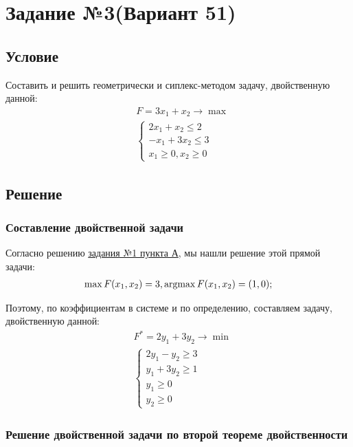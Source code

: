 \section{Задание №3(Вариант 51)}\label{03-lab}
\subsection{Условие}\label{03-lab-condition}

Составить и решить геометрически и сиплекс-методом задачу, двойственную данной:
\begin{align*}
    &F = 3x_1 + x_2 \to \max\\
    &\begin{cases}
        2x_1 + x_2 \leq 2\\
        -x_1 + 3x_2 \leq 3\\
        x_1 \geq 0, x_2 \geq 0
    \end{cases}
\end{align*}

\subsection{Решение}\label{03-lab-solution}

\subsubsection{Составление двойственной задачи}
Согласно решению \hyperref[01-lab-a-answer]{задания №1 пункта А}, мы нашли решение этой прямой задачи:
\begin{align*}
    \max F(x_1, x_2) = 3, \operatorname*{argmax} F(x_1, x_2) = (1, 0);\\
\end{align*} 

Поэтому, по коэффициентам в системе и по определению, составляем задачу, двойственную данной:
\begin{align*}
    &F^{*} = 2y_1 + 3y_2 \to \min\\
    &\begin{cases}
        2y_1 - y_2 \geq 3\\
        y_1 + 3y_2 \geq 1\\
        y_1 \geq 0\\
        y_2 \geq 0
    \end{cases}
\end{align*}

\subsubsection{Решение двойственной задачи по второй теореме двойственности}

